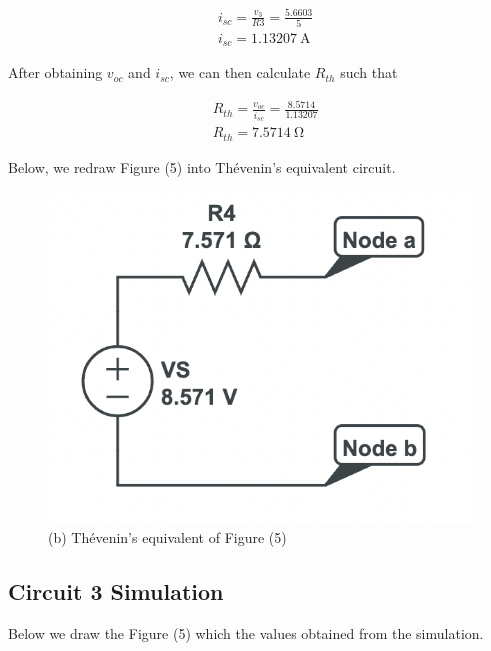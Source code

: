 \documentclass[12pt]{article}
\begin{document}
\begin{equation}
    \begin{split}
        &i_{sc} = \frac{v_3}{R3} = \frac{5.6603}{5} \\
        &i_{sc} = \SI{1.13207}{\ampere}
    \end{split}
\end{equation}

After obtaining $v_{oc}$ and $i_{sc}$, we can then calculate $R_{th}$ such that

\begin{equation}
    \begin{split}
        &R_{th} = \frac{v_{oc}}{i_{sc}} = \frac{8.5714}{1.13207} \\
        &R_{th} = \SI{7.5714}{\ohm}
    \end{split}
\end{equation}

Below, we redraw Figure (5) into Thévenin's equivalent circuit.

\begin{figure}[H]
    \begin{center}
        \includegraphics[scale=0.6]{circuit-3-v2.png}
        \caption { (b) Thévenin's equivalent of Figure (5) }
    \end{center}
\end{figure}

\subsection{Circuit 3 Simulation}
Below we draw the Figure (5) which the values obtained from the simulation.
\end{document}
